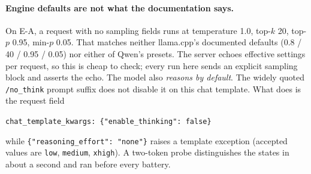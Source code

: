\paragraph{Engine defaults are not what the documentation says.} On E-A, a request with no sampling
fields runs at temperature 1.0, top-$k$ 20, top-$p$ 0.95, min-$p$ 0.05. That matches neither
llama.cpp's documented defaults (0.8 / 40 / 0.95 / 0.05) nor either of Qwen's presets. The server
echoes effective settings per request, so this is cheap to check; every run here sends an explicit
sampling block and asserts the echo. The model also \emph{reasons by default}. The widely quoted
\texttt{/no\_think} prompt suffix does not disable it on this chat template. What does is the request field
\begin{center}\verb|chat_template_kwargs: {"enable_thinking": false}|\end{center}
while \verb|{"reasoning_effort": "none"}| raises a template exception (accepted values are
\texttt{low}, \texttt{medium}, \texttt{xhigh}). A two-token probe distinguishes the states in about a second and
ran before every battery.
